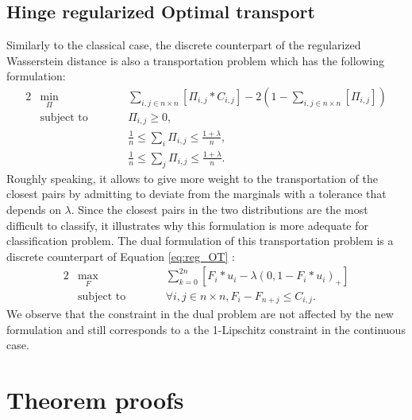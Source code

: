 \subsection{Hinge regularized Optimal transport}
Similarly to the classical case, the discrete counterpart of the regularized Wasserstein distance is also a transportation problem which has the following formulation:
\begin{alignat*}{2}
&\!\min_{\Pi}        &\qquad& \sum_{i,j \in n\times n}\left[\Pi_{i,j}*C_{i,j}\right]-2\left(1-\sum_{i,j \in  n\times n}\left[\Pi_{i,j}\right]\right)\\
&\text{subject to} &      & \Pi_{i,j} \geq 0,\\
&                  &      & \frac{1}{n} \leq \sum_i \Pi_{i,j} \leq  \frac{1+\lambda}{n},\\
&                  &      & \frac{1}{n} \leq \sum_j \Pi_{i,j} \leq  \frac{1+\lambda}{n}.
\end{alignat*}
Roughly speaking, it allows to give more weight to the transportation of the closest pairs by admitting to deviate from the marginals with a tolerance that depends on $\lambda$. Since the closest pairs in the two distributions are the most difficult to classify, it illustrates why this formulation is more adequate for classification problem. 
The dual formulation of this transportation problem is a discrete counterpart of Equation \ref{eq:reg_OT} :
\begin{alignat*}{2}
&\!\max_{F}        &\qquad& \sum_{k =0}^{2n} \left[F_i*u_i -\lambda (0,1-F_i*u_i)_+\right]\\
&\text{subject to} &      & \forall i,j \in n\times n, F_i-F_{n+j}\leq C_{i,j}.
\end{alignat*}
We observe that the constraint in the dual problem are not affected by the new formulation and still corresponds to a the 1-Lipschitz constraint in the continuous case. 


\section{Theorem proofs}
\label{appendix:proofs}
